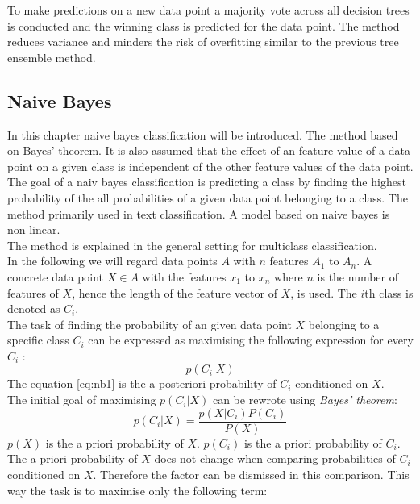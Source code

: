 To make predictions on a new data point  a majority vote across all decision trees is conducted and the winning class is predicted for the data point. The method reduces variance and minders the risk of overfitting similar to the previous tree ensemble method.\cite{friedman2000additive} \cite{james2013introduction}

\subsection{Naive Bayes}
In this chapter naive bayes classification will be introduced. The method based on Bayes’ theorem. It is also assumed that the effect of an feature value of a data point on a given class is independent of the other feature values of the data point. The goal of a naiv bayes classification is predicting a class by finding the highest probability of the all probabilities of a given data point belonging to a class. The method primarily used in text classification.
A model based on naive bayes is non-linear.
\\
The method is explained in the general setting for multiclass classification.
\\
In the following we will regard data points $A$ with $n$ features $A_1$ to $A_n$. A concrete data point $X \in A$ with the features $x_1$ to $x_n$ where $n$ is the number of features of $X$, hence the length of the feature vector of $X$, is used. The $i$th class is denoted as $C_i$.\\
The task of finding the probability of an given data point $X$ belonging to a specific class $C_i$ can be expressed as maximising the following expression for every $C_i$ :
\begin{equation} \label{eq:nb1}
 p(C_i|X)
\end{equation}
The equation \ref{eq:nb1} is the a posteriori probability of $C_i$ conditioned on $X$.
\\
The initial goal of maximising $p(C_i|X)$ can be rewrote using \emph{Bayes' theorem}:
\begin{equation} \label{eq:nb2}
p(C_i|X)=\frac{p(X|C_i) P(C_i)}{P(X)}
\end{equation}
$p(X)$ is the a priori probability of $X$. $p(C_i)$ is the a priori probability of $C_i$.
\\
The a priori probability of $X$ does not change when comparing probabilities of $C_i$ conditioned on $X$. Therefore the factor can be dismissed in this comparison. This way the task is to maximise only the following term:
